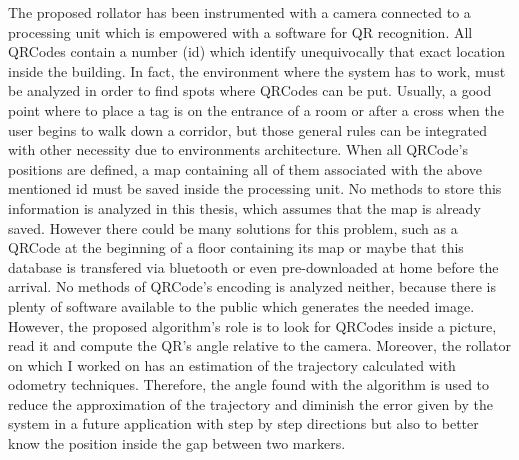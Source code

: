 The proposed rollator has been instrumented with a camera connected to a processing unit which is empowered with a software for QR recognition.
All QRCodes contain a number (id) which identify unequivocally that exact location inside the building. In fact, the environment where the system has to work, must be analyzed in order to find spots where QRCodes can be put.
Usually, a good point where to place a tag is on the entrance of a room or after a cross when the user begins to walk down a corridor, but those general rules can be integrated with other necessity due to environments architecture. 
When all QRCode's positions are defined, a map containing all of them associated with the above mentioned id must be saved inside the processing unit.\newline
No methods to store this information is analyzed in this thesis, which assumes that the map is already saved. However there could be many solutions for this problem, such as a QRCode at the beginning of a floor containing its map or maybe that this database is transfered via bluetooth or even pre-downloaded at home before the arrival. No methods of QRCode's encoding is analyzed neither, because there is plenty of software available to the public which generates the needed image.
\newline
However, the proposed algorithm's role is to look for QRCodes inside a picture, read it and compute the QR's angle relative to the camera. Moreover, the rollator on which I worked on has an estimation of the trajectory calculated with odometry techniques. Therefore, the angle found with the algorithm is used to reduce the approximation of the trajectory and diminish the error given by the system in a future application with step by step directions but also to better know the position inside the gap between two markers.






   













  
